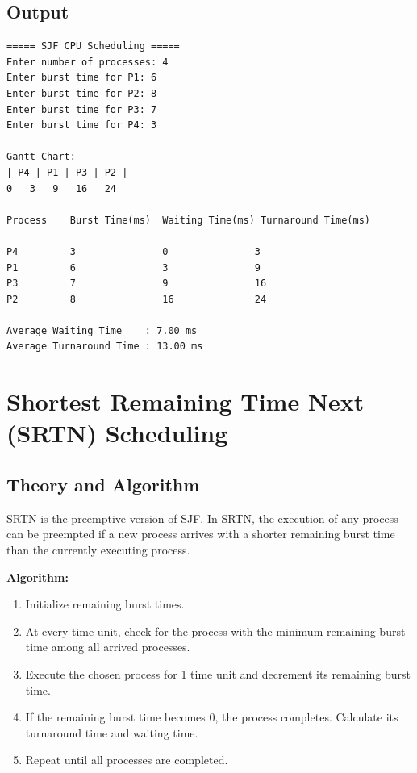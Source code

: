 \documentclass[12pt,a4paper]{article}
\begin{document}
\subsection{Output}
\begin{verbatim}
===== SJF CPU Scheduling =====
Enter number of processes: 4
Enter burst time for P1: 6
Enter burst time for P2: 8
Enter burst time for P3: 7
Enter burst time for P4: 3

Gantt Chart:
| P4 | P1 | P3 | P2 |
0   3   9   16   24

Process    Burst Time(ms)  Waiting Time(ms) Turnaround Time(ms)
----------------------------------------------------------
P4         3               0               3              
P1         6               3               9              
P3         7               9               16             
P2         8               16              24             
----------------------------------------------------------
Average Waiting Time    : 7.00 ms
Average Turnaround Time : 13.00 ms
\end{verbatim}


\newpage
\section{Shortest Remaining Time Next (SRTN) Scheduling}

\subsection{Theory and Algorithm}
SRTN is the preemptive version of SJF. In SRTN, the execution of any process can be preempted if a new process arrives with a shorter remaining burst time than the currently executing process.

\textbf{Algorithm:}
\begin{enumerate}
    \item Initialize remaining burst times.
    \item At every time unit, check for the process with the minimum remaining burst time among all arrived processes.
    \item Execute the chosen process for 1 time unit and decrement its remaining burst time.
    \item If the remaining burst time becomes 0, the process completes. Calculate its turnaround time and waiting time.
    \item Repeat until all processes are completed.
\end{enumerate}
\end{document}

